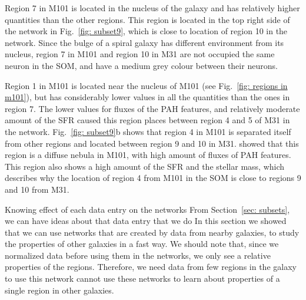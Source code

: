     Region 7 in M101 is located in the nucleus of the galaxy and has relatively higher quantities than the other regions.
    This region is located in the top right side of the network in Fig.~\ref{fig: subset9}, which is close to location of region 10 in the network.
    Since the bulge of a spiral galaxy has different environment from its nucleus, region 7 in M101 and region 10 in M31 are not occupied the same neuron in the SOM, and have a medium grey colour between their neurons.

    Region 1 in M101 is located near the nucleus of M101 (see Fig.~\ref{fig: regions in m101}), but has considerably lower values in all the quantities than the ones in region 7.
    The lower values for fluxes of the PAH features, and relatively moderate amount of the SFR caused this region places between region 4 and 5 of M31 in the network. 
    Fig.~\ref{fig: subset9}b shows that region 4 in M101 is separated itself from other regions and located between region 9 and 10 in M31.
    \cite{Gordon08} showed that this region is a diffuse nebula in M101, with high amount of fluxes of PAH features. 
    This region also shows a high amount of the SFR and the stellar mass, which describes why the location of region 4 from M101 in the SOM is close to regions 9 and 10 from M31.
    
    Knowing effect of each data entry on the networks From Section~\ref{sec: subsets}, we can have ideas about that data entry that we do
    In this section we showed that we can use networks that are created by data from nearby galaxies, to study the properties of other galaxies in a fast way.
    We should note that, since we normalized data before using them in the networks, we only see a relative properties of the regions.
    Therefore, we need data from few regions in the galaxy to use this network cannot use these networks to learn about properties of a single region in other galaxies.
    
    
